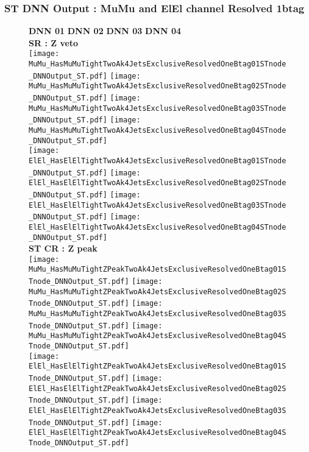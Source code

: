 \documentclass[9pt]{beamer}
\begin{document}
\begin{frame}
	\frametitle{ST DNN Output : MuMu and ElEl channel Resolved 1btag}
	\begin{figure}
	    \textbf{DNN 01} \hspace{1.2cm} \textbf{DNN 02} \hspace{1.2cm} \textbf{DNN 03} \hspace{1.2cm} \textbf{DNN 04} \\
        \centering
        \textbf{SR : Z veto} \\
		\texttt{[image: MuMu\_HasMuMuTightTwoAk4JetsExclusiveResolvedOneBtag01STnode\_DNNOutput\_ST.pdf]}
		\texttt{[image: MuMu\_HasMuMuTightTwoAk4JetsExclusiveResolvedOneBtag02STnode\_DNNOutput\_ST.pdf]}
		\texttt{[image: MuMu\_HasMuMuTightTwoAk4JetsExclusiveResolvedOneBtag03STnode\_DNNOutput\_ST.pdf]}
		\texttt{[image: MuMu\_HasMuMuTightTwoAk4JetsExclusiveResolvedOneBtag04STnode\_DNNOutput\_ST.pdf]}\\
		\texttt{[image: ElEl\_HasElElTightTwoAk4JetsExclusiveResolvedOneBtag01STnode\_DNNOutput\_ST.pdf]}
		\texttt{[image: ElEl\_HasElElTightTwoAk4JetsExclusiveResolvedOneBtag02STnode\_DNNOutput\_ST.pdf]}
		\texttt{[image: ElEl\_HasElElTightTwoAk4JetsExclusiveResolvedOneBtag03STnode\_DNNOutput\_ST.pdf]}
		\texttt{[image: ElEl\_HasElElTightTwoAk4JetsExclusiveResolvedOneBtag04STnode\_DNNOutput\_ST.pdf]}\\
        \textbf{ST CR : Z peak} \\
		\texttt{[image: MuMu\_HasMuMuTightZPeakTwoAk4JetsExclusiveResolvedOneBtag01STnode\_DNNOutput\_ST.pdf]}
		\texttt{[image: MuMu\_HasMuMuTightZPeakTwoAk4JetsExclusiveResolvedOneBtag02STnode\_DNNOutput\_ST.pdf]}
		\texttt{[image: MuMu\_HasMuMuTightZPeakTwoAk4JetsExclusiveResolvedOneBtag03STnode\_DNNOutput\_ST.pdf]}
		\texttt{[image: MuMu\_HasMuMuTightZPeakTwoAk4JetsExclusiveResolvedOneBtag04STnode\_DNNOutput\_ST.pdf]}\\
		\texttt{[image: ElEl\_HasElElTightZPeakTwoAk4JetsExclusiveResolvedOneBtag01STnode\_DNNOutput\_ST.pdf]}
		\texttt{[image: ElEl\_HasElElTightZPeakTwoAk4JetsExclusiveResolvedOneBtag02STnode\_DNNOutput\_ST.pdf]}
		\texttt{[image: ElEl\_HasElElTightZPeakTwoAk4JetsExclusiveResolvedOneBtag03STnode\_DNNOutput\_ST.pdf]}
		\texttt{[image: ElEl\_HasElElTightZPeakTwoAk4JetsExclusiveResolvedOneBtag04STnode\_DNNOutput\_ST.pdf]}\\
	\end{figure}
\end{frame}
\end{document}
